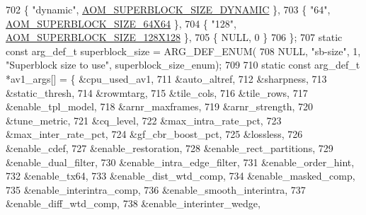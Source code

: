 \begin{DoxyCodeInclude}
{{{{{{{702   \{ \textcolor{stringliteral}{"dynamic"}, \hyperlink{group__codec_ggac34a24f7c6c0fef7518aed0da4425f61aaabb4d9ad771b2fa177ff6fb5437b179}{AOM\_SUPERBLOCK\_SIZE\_DYNAMIC} \},
703   \{ \textcolor{stringliteral}{"64"}, \hyperlink{group__codec_ggac34a24f7c6c0fef7518aed0da4425f61a5abd24080a18d4f7e33217d93a73e968}{AOM\_SUPERBLOCK\_SIZE\_64X64} \},
704   \{ \textcolor{stringliteral}{"128"}, \hyperlink{group__codec_ggac34a24f7c6c0fef7518aed0da4425f61a17127133dafcd42b1d792770981d67d0}{AOM\_SUPERBLOCK\_SIZE\_128X128} \},
705   \{ NULL, 0 \}
706 \};
707 \textcolor{keyword}{static} \textcolor{keyword}{const} arg\_def\_t superblock\_size = ARG\_DEF\_ENUM(
708     NULL, \textcolor{stringliteral}{"sb-size"}, 1, \textcolor{stringliteral}{"Superblock size to use"}, superblock\_size\_enum);
709 
710 \textcolor{keyword}{static} \textcolor{keyword}{const} arg\_def\_t *av1\_args[] = \{ &cpu\_used\_av1,
711                                        &auto\_altref,
712                                        &sharpness,
713                                        &static\_thresh,
714                                        &rowmtarg,
715                                        &tile\_cols,
716                                        &tile\_rows,
717                                        &enable\_tpl\_model,
718                                        &arnr\_maxframes,
719                                        &arnr\_strength,
720                                        &tune\_metric,
721                                        &cq\_level,
722                                        &max\_intra\_rate\_pct,
723                                        &max\_inter\_rate\_pct,
724                                        &gf\_cbr\_boost\_pct,
725                                        &lossless,
726                                        &enable\_cdef,
727                                        &enable\_restoration,
728                                        &enable\_rect\_partitions,
729                                        &enable\_dual\_filter,
730                                        &enable\_intra\_edge\_filter,
731                                        &enable\_order\_hint,
732                                        &enable\_tx64,
733                                        &enable\_dist\_wtd\_comp,
734                                        &enable\_masked\_comp,
735                                        &enable\_interintra\_comp,
736                                        &enable\_smooth\_interintra,
737                                        &enable\_diff\_wtd\_comp,
738                                        &enable\_interinter\_wedge,
}}}}}}}
\end{DoxyCodeInclude}
